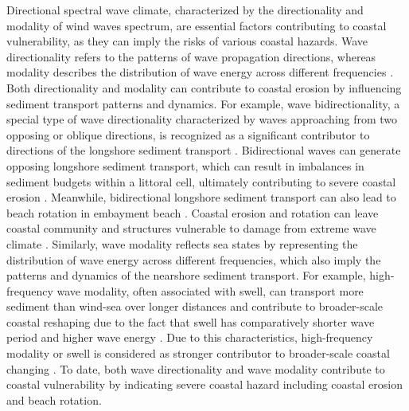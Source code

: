Directional spectral wave climate, characterized by the directionality and
modality of wind waves spectrum, are essential factors contributing to coastal
vulnerability, as they can imply the risks of various coastal hazards. Wave
directionality refers to the patterns of wave propagation directions, whereas
modality describes the distribution of wave energy across different frequencies
\citep{coates_beach_1998,wiggins_coastal_2019,wiggins_regionally-coherent_2019}.
Both directionality and modality can contribute to coastal erosion by
influencing sediment transport patterns and dynamics. For example, wave
bidirectionality, a special type of wave directionality characterized by waves
approaching from two opposing or oblique directions, is recognized as a
significant contributor to directions of the longshore sediment transport
\citep{seymour_longshore_2019}. Bidirectional waves can generate opposing
longshore sediment transport, which can result in imbalances in sediment budgets
within a littoral cell, ultimately contributing to severe coastal erosion
\citep{davidson-arnott_wave_1980,galal_influence_2011,hapke_review_2010}.
Meanwhile, bidirectional longshore sediment transport can also lead to beach
rotation in embayment beach
\citep{klein_short-term_2002,wiggins_regionally-coherent_2019}. Coastal erosion
and rotation can leave coastal community and structures vulnerable to damage
from extreme wave climate \citep{wiggins_coastal_2019}. Similarly, wave modality
reflects sea states by representing the distribution of wave energy across
different frequencies, which also imply the patterns and dynamics of the
nearshore sediment transport. For example, high-frequency wave modality, often
associated with swell, can transport more sediment than wind-sea over longer
distances and contribute to broader-scale coastal reshaping due to the fact that
swell has comparatively shorter wave period and higher wave energy
\citep{george_nearshore_2020}. Due to this characteristics, high-frequency
modality or swell is considered as stronger contributor to broader-scale coastal
changing \citep{basaran_effect_2021}. To date, both wave directionality and wave
modality contribute to coastal vulnerability by indicating severe coastal hazard
including coastal erosion and beach rotation. 

